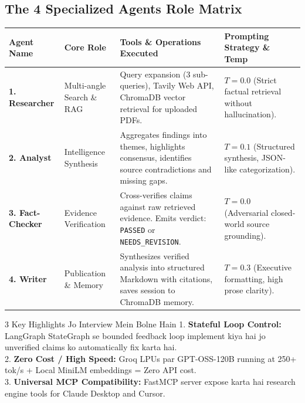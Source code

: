\documentclass[9.5pt, a4paper]{article}
\begin{document}
\vspace{-6pt}
\subsection{The 4 Specialized Agents Role Matrix}
\vspace{-2pt}

\begin{table}[H]
\centering
\scriptsize
\begin{tabularx}{\textwidth}{l p{2.4cm} p{5.5cm} X}
\toprule
\rowcolor{primary!10}
\textbf{Agent Name} & \textbf{Core Role} & \textbf{Tools \& Operations Executed} & \textbf{Prompting Strategy \& Temp} \\
\midrule
\textbf{1. Researcher} & Multi-angle Search \& RAG & Query expansion (3 sub-queries), Tavily Web API, ChromaDB vector retrieval for uploaded PDFs. & $T=0.0$ (Strict factual retrieval without hallucination). \\
\textbf{2. Analyst} & Intelligence Synthesis & Aggregates findings into themes, highlights consensus, identifies source contradictions and missing gaps. & $T=0.1$ (Structured synthesis, JSON-like categorization). \\
\textbf{3. Fact-Checker} & Evidence Verification & Cross-verifies claims against raw retrieved evidence. Emits verdict: \texttt{PASSED} or \texttt{NEEDS\_REVISION}. & $T=0.0$ (Adversarial closed-world source grounding). \\
\textbf{4. Writer} & Publication \& Memory & Synthesizes verified analysis into structured Markdown with citations, saves session to ChromaDB memory. & $T=0.3$ (Executive formatting, high prose clarity). \\
\bottomrule
\end{tabularx}
\end{table}

\vspace{-4pt}
\begin{summarybox}{3 Key Highlights Jo Interview Mein Bolne Hain}
1. \textbf{Stateful Loop Control:} LangGraph StateGraph se bounded feedback loop implement kiya hai jo unverified claims ko automatically fix karta hai.\\
2. \textbf{Zero Cost / High Speed:} Groq LPUs par GPT-OSS-120B running at 250+ tok/s + Local MiniLM embeddings = Zero API cost.\\
3. \textbf{Universal MCP Compatibility:} FastMCP server expose karta hai research engine tools for Claude Desktop and Cursor.
\end{summarybox}
\end{document}
